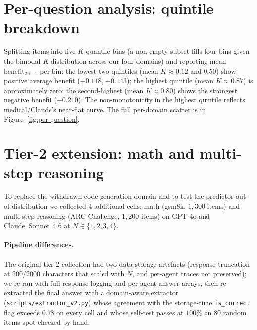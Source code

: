 \documentclass{article}
\begin{document}
\section{Per-question analysis: quintile breakdown}
\label{app:per-question-detail}

Splitting items into five $K$-quantile bins (a non-empty subset fills four bins given the bimodal $K$ distribution across our four domains) and reporting mean $\mathrm{benefit}_{2{\leftarrow}1}$ per bin: the lowest two quintiles (mean $K \approx 0.12$ and $0.50$) show positive average benefit ($+0.118$, $+0.143$); the highest quintile (mean $K \approx 0.87$) is approximately zero; the second-highest (mean $K \approx 0.80$) shows the strongest negative benefit ($-0.210$). The non-monotonicity in the highest quintile reflects medical/Claude's near-flat curve. The full per-domain scatter is in Figure~\ref{fig:per-question}.


\section{Tier-2 extension: math and multi-step reasoning}
\label{app:in-progress}

To replace the withdrawn code-generation domain and to test the predictor
out-of-distribution we collected $4$ additional cells: math (gsm8k,
$1{,}300$ items) and multi-step reasoning (ARC-Challenge, $1{,}200$ items)
on GPT-4o and Claude~Sonnet~4.6 at $N{\in}\{1,2,3,4\}$.

\paragraph{Pipeline differences.} The original tier-2 collection had two
data-storage artefacts (response truncation at $200$/$2000$ characters that
scaled with $N$, and per-agent traces not preserved); we re-ran with
full-response logging and per-agent answer arrays, then re-extracted the
final answer with a domain-aware extractor (\texttt{scripts/extractor\_v2.py})
whose agreement with the storage-time \texttt{is\_correct} flag exceeds
$0.78$ on every cell and whose self-test passes at $100\%$ on $80$ random
items spot-checked by hand.
\end{document}
